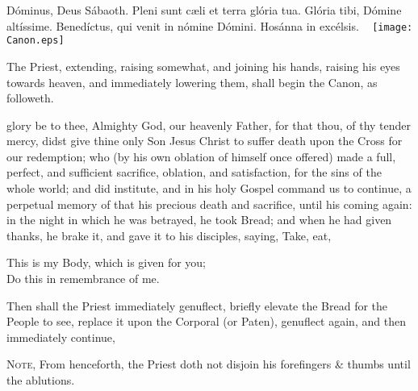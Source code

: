 

{ Dóminus, Deus Sábaoth. Pleni sunt c{\ae}li et terra glória tua. Glória tibi, Dómine altíssime. Benedíctus, {} qui venit in nómine Dómini. Hosánna in excélsis.}
\clearpage
\checkoddpage
\ifoddpage \thispagestyle{empty}
~\clearpage\fi
\thispagestyle{empty}
\texttt{[image: Canon.eps]}
\setcounter{margcount}{1}
\clearpage
{}
\begin{rubric}
    The Priest, extending, raising somewhat, and joining his hands, raising his eyes towards heaven, and immediately lowering them, shall begin the Canon, as followeth.
\end{rubric}
 glory be to thee, Almighty God, our heavenly Father, for that thou, of thy tender mercy, didst give thine only Son Jesus Christ to suffer death upon the Cross for our redemption; who (by his own oblation of himself once offered) made a full, perfect, and sufficient sacrifice, oblation, and satisfaction, for the sins of the whole world; and did institute, and in his holy Gospel command us to continue, a perpetual memory of that his precious death and sacrifice, until his coming again:
\noindent
{} in the night in which he was betrayed, he took Bread; and when he had given {} thanks, he brake it, and gave it to his disciples, saying, Take, eat,
\begin{center}
\large{This is my Body, which is given for you;\\Do this in remembrance of me.}
\end{center}
\begin{secrubric}
    Then shall the Priest immediately genuflect, briefly elevate the Bread for the People to see, replace it upon the Corporal (or Paten), genuflect again, and then immediately continue,\par
    \textsc{Note,} From henceforth, the Priest doth not disjoin his forefingers \& thumbs until the ablutions.
\end{secrubric}\par\noindent
